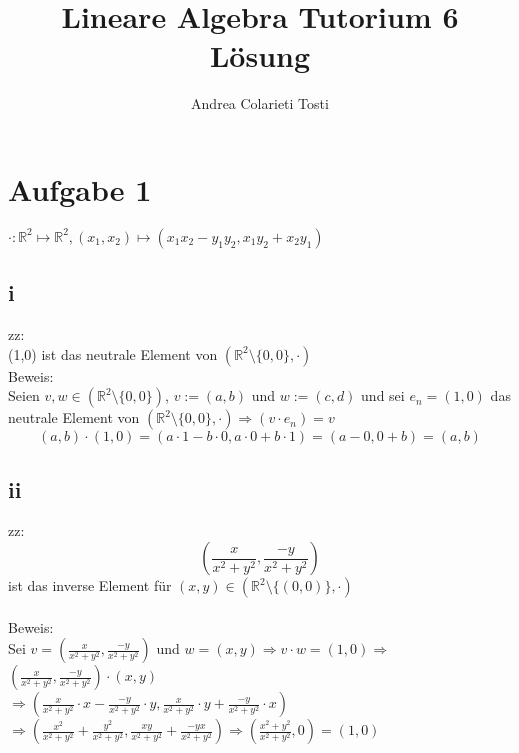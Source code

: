 \documentclass[10pt,a4paper]{article}
\author{Andrea Colarieti Tosti}
\title{Lineare Algebra Tutorium 6 Lösung}
\begin{document}
\maketitle
\newpage

\section{Aufgabe 1}
$\cdot : \mathbb{R}^2 \mapsto \mathbb{R}^2,(x_{1},x_{2})\mapsto(x_{1}x_{2}-y_{1}y_{2} , x_{1}y_{2}+x_{2}y_{1})$
\subsection{i}
zz: \\(1,0) ist das neutrale Element von $(\mathbb{R}^{2}\setminus\{0,0\}, \cdot)$\\
Beweis:\\
Seien $v, w \in (\mathbb{R}^2\setminus\{0,0\}) $, 
$ v:=(a,b)$ und $w:=(c,d)$ und sei $e_{n} = (1,0)$ das neutrale Element von $(\mathbb{R}^2\setminus\{0,0\}, \cdot) \Rightarrow (v \cdot e_{n}) = v$  \\
\begin{equation*}
(a,b) \cdot (1,0) = (a\cdot1-b\cdot0 , a\cdot0+b\cdot1) = (a-0,0+b)=(a,b) 
\end{equation*}
\begin{flushright}
\checkmark
\end{flushright}
\subsection{ii}
zz: 
\begin{equation*}
(\frac{x}{x^2+y^2},\frac{-y}{x^2+y^2})
\end{equation*}
ist das inverse Element für $(x,y)\in(\mathbb{R}^2\setminus\{(0,0)\},\cdot)$\\\\
Beweis:\\
Sei $v = (\frac{x}{x^2+y^2},\frac{-y}{x^2+y^2})$ und $w = (x,y) \Rightarrow v \cdot w = (1,0) \Rightarrow $\\
$(\frac{x}{x^2+y^2},\frac{-y}{x^2+y^2})\cdot(x,y)$\\
$\Rightarrow(\frac{x}{x^2+y^2}\cdot x-\frac{-y}{x^2+y^2}\cdot y,\frac{x}{x^2+y^2}\cdot y+\frac{-y}{x^2+y^2}\cdot x) $ \\
$\Rightarrow(\frac{x^2}{x^2+y^2}+\frac{y^2}{x^2+y^2},\frac{xy}{x^2+y^2}+\frac{-yx}{x^2+y^2})\Rightarrow(\frac{x^2+y^2}{x^2+y^2},0)=(1,0)$
\begin{flushright}
\checkmark
\end{flushright}
\end{document}
